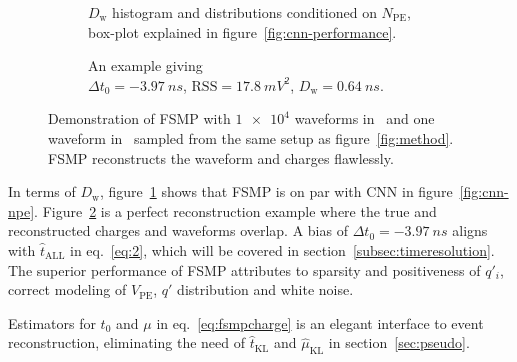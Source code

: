 \begin{figure}[H]
  \begin{subfigure}[b]{.45\textwidth}
    \centering
    \resizebox{1.05\textwidth}{!}{}
    \caption{\label{fig:fsmp-npe} $D_\mathrm{w}$ histogram and distributions conditioned on $N_{\mathrm{PE}}$, box-plot explained in figure~\ref{fig:cnn-performance}.}
  \end{subfigure}
  \hspace{0.5em}
  \begin{subfigure}[b]{.55\textwidth}
    \centering
    \resizebox{\textwidth}{!}{}
    \caption{\label{fig:fsmp} An example giving \\ $\Delta{t_0}=\SI{-3.97}{ns}$, $\mathrm{RSS}=\SI{17.8}{mV^2}$, $D_\mathrm{w}=\SI{0.64}{ns}$.}
  \end{subfigure}
  \caption{\label{fig:fsmp-performance}Demonstration of FSMP with $\num[retain-unity-mantissa=false]{1e4}$ waveforms in~ and one waveform in~ sampled from the same setup as figure~\ref{fig:method}.  FSMP reconstructs the waveform and charges flawlessly.}
\end{figure}
In terms of $D_\mathrm{w}$, figure~\ref{fig:fsmp-npe} shows that FSMP is on par with CNN in figure~\ref{fig:cnn-npe}.  Figure~\ref{fig:fsmp} is a perfect reconstruction example where the true and reconstructed charges and waveforms overlap.  A bias of $\Delta{t_0}=\SI{-3.97}{ns}$ aligns with $\hat{t}_\mathrm{ALL}$ in eq.~\eqref{eq:2}, which will be covered in section~\ref{subsec:timeresolution}.  The superior performance of FSMP attributes to sparsity and positiveness of $q'_i$, correct modeling of $V_\mathrm{PE}$, $q'$ distribution and white noise.

Estimators for $t_0$ and $\mu$ in eq.~\eqref{eq:fsmpcharge} is an elegant interface to event reconstruction, eliminating the need of $\hat{t}_\mathrm{KL}$ and $\hat{\mu}_\mathrm{KL}$ in section~\ref{sec:pseudo}.

